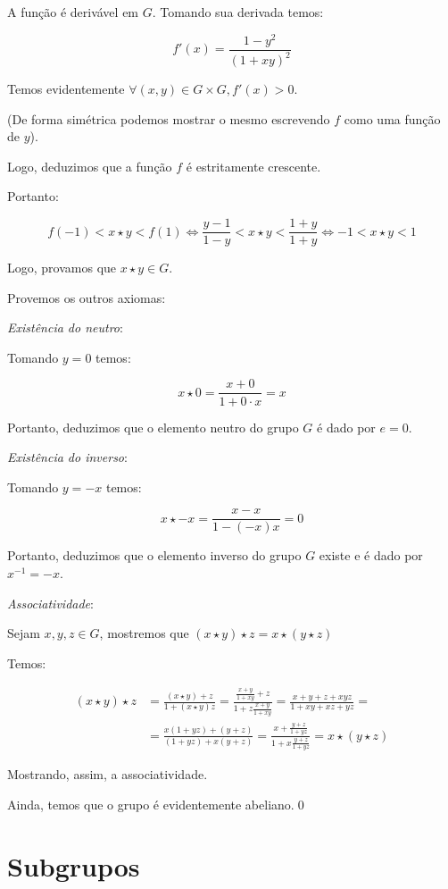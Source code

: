 \documentclass[16pt,openany]{book}
\theoremstyle{definition}
\begin{document}
A função é derivável em $G$. Tomando sua derivada temos:

\[
f'(x) = \frac{1 - y^2}{(1+xy)^2} 
\]

Temos evidentemente $\forall (x, y) \in G \times G, f'(x) > 0$.

(De forma simétrica podemos mostrar o mesmo escrevendo $f$ como uma função de $y$).

Logo, deduzimos que a função $f$ é estritamente crescente.

Portanto:

\[
f(-1)<x \star y < f(1) \iff \frac{y-1}{1-y} < x \star y < \frac{1+y}{1+y} \iff -1 <x\star y < 1
\]

Logo, provamos que $x\star y \in G$.

Provemos os outros axiomas:

\textit{Existência do neutro}:

Tomando $y = 0$ temos:

\[
x\star 0 = \frac{x + 0}{1 + 0\cdot x} = x
\]

Portanto, deduzimos que o elemento neutro do grupo $G$ é dado por $e = 0$.

\textit{Existência do inverso}:

Tomando $y = -x$ temos:

\[
x\star -x = \frac{x -x}{1 - (-x)x} = 0
\]

Portanto, deduzimos que o elemento inverso do grupo $G$ existe e é dado por $x^{-1} = -x$.

\textit{Associatividade}:

Sejam $x, y, z \in G$, mostremos que $(x\star y)\star z = x\star (y\star z)$

Temos:

\begin{align*}
(x\star y)\star z &= \frac{(x\star y) + z}{1+(x\star y)z} = \frac{\frac{x+y}{1+xy} + z}{1 + z\frac{x+y}{1 +xy}} = \frac{x + y+z+xyz}{1+xy+xz+yz} = \\[10pt]
&= \frac{x(1+yz) + (y +z)}{(1+yz)+x(y+z)} = \frac{x+\frac{y+z}{1+yz}}{1+x\frac{y+z}{1+yz}} = x\star (y\star z)
\end{align*}

Mostrando, assim, a associatividade.

Ainda, temos que o grupo é evidentemente abeliano.\qed

\section{Subgrupos}
\end{document}
